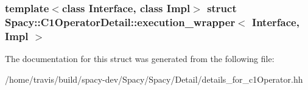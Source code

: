 \subsubsection*{template$<$class Interface, class Impl$>$ struct Spacy\-::\-C1\-Operator\-Detail\-::execution\-\_\-wrapper$<$ Interface, Impl $>$}



\-The documentation for this struct was generated from the following file\-:\begin{DoxyCompactItemize}
\item 
/home/travis/build/spacy-\/dev/\-Spacy/\-Spacy/\-Detail/details\-\_\-for\-\_\-c1\-Operator.\-hh\end{DoxyCompactItemize}
